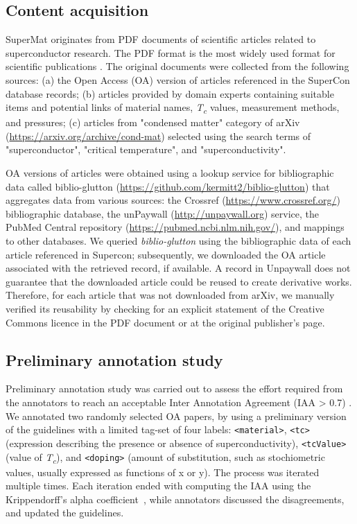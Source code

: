 \documentclass[fleqn,10pt]{wlscirep}
\begin{document}
\subsection*{Content acquisition}
SuperMat originates from PDF documents of scientific articles related to superconductor research. 
The PDF format is the most widely used format for scientific publications \cite{johnson2018pdfStatistics}.
The original documents were collected from the following sources: (a) the Open Access (OA) version of articles referenced in the SuperCon database records; 
(b) articles provided by domain experts containing suitable items and potential links of material names, \textit{T\textsubscript{c}} values, measurement methods, and pressures; (c) articles from "condensed matter" category of arXiv (\url{https://arxiv.org/archive/cond-mat}) selected using the search terms of "superconductor", "critical temperature", and "superconductivity". 

OA versions of articles were obtained using a lookup service for bibliographic data called biblio-glutton (\url{https://github.com/kermitt2/biblio-glutton}) that aggregates data from various sources: the Crossref (\url{https://www.crossref.org/}) bibliographic database, the unPaywall (\url{http://unpaywall.org}) service, the PubMed Central repository (\url{https://pubmed.ncbi.nlm.nih.gov/}), and mappings to other databases. 
We queried \textit{biblio-glutton} using the bibliographic data of each article referenced in Supercon; subsequently, we downloaded the OA article associated with the retrieved record, if available. 
A record in Unpaywall does not guarantee that the downloaded article could be reused to create derivative works. Therefore, for each article that was not downloaded from arXiv, we manually verified its reusability by checking for an explicit statement of the Creative Commons licence in the PDF document or at the original publisher's page. 

\subsection*{Preliminary annotation study}
\label{subsec:preliminary-annotation-study}
Preliminary annotation study was carried out to assess the effort required from the annotators to reach an acceptable Inter Annotation Agreement (IAA > 0.7) .
We annotated two randomly selected OA papers, by using a preliminary version of the guidelines with a limited tag-set of four labels: \texttt{<material>}, \texttt{<tc>} (expression describing the presence or absence of superconductivity), \texttt{<tcValue>} (value of \textit{T\textsubscript{c}}), and \texttt{<doping>} (amount of substitution, such as stochiometric values, usually expressed as functions of x or y).
The process was iterated multiple times.
Each iteration ended with computing the IAA using the Krippendorff's alpha coefficient~\cite{Krippendorff2004ReliabilityIC,Zapf2016MeasuringIR}, while annotators discussed the disagreements, and updated the guidelines.
\end{document}
